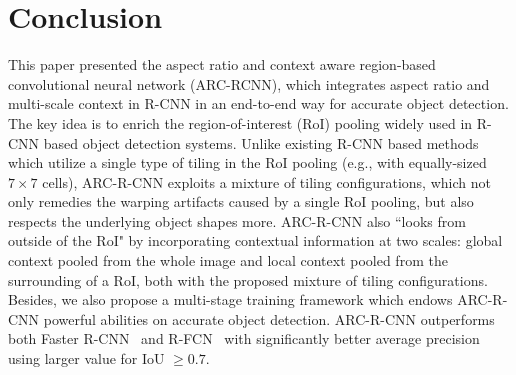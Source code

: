 \documentclass[10pt,twocolumn,letterpaper]{article}
\begin{document}
\section{Conclusion}
\vspace{-1mm}
This paper presented the aspect ratio and context aware  region-based convolutional neural network (ARC-RCNN), which integrates aspect ratio and multi-scale context in R-CNN in an end-to-end way for accurate object detection. The key idea is to enrich the region-of-interest (RoI) pooling widely used in R-CNN based object detection systems.  Unlike existing R-CNN based methods which utilize a single type of tiling in the RoI pooling (e.g., with equally-sized $7\times 7$ cells), ARC-R-CNN exploits a mixture of tiling configurations, which not only remedies the warping artifacts caused by a single RoI pooling, but also respects the underlying object shapes more. ARC-R-CNN also ``looks from outside of the RoI" by incorporating contextual information at two scales: global context pooled from the whole image  and local context pooled from the surrounding of a RoI, both with the proposed mixture of tiling configurations. 
Besides, we also propose a multi-stage training framework which endows ARC-R-CNN powerful abilities on accurate object detection.
ARC-R-CNN outperforms both Faster R-CNN~\cite{faster_rcnn} and R-FCN~\cite{rfcn} with significantly better average precision using larger value for IoU $\ge 0.7$. 
\end{document}
